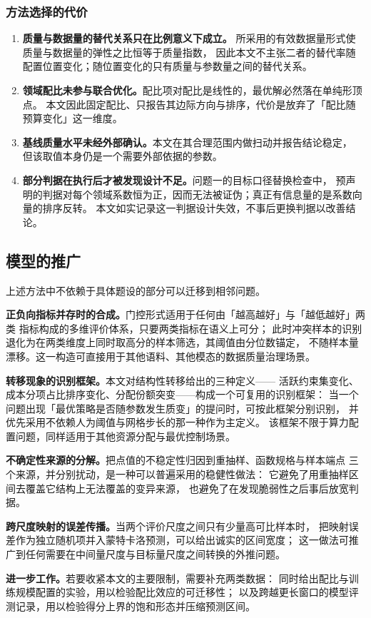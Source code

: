 \subsubsection{方法选择的代价}
\begin{enumerate}[label=(\arabic*),leftmargin=2.2em,itemsep=2pt]
  \item \textbf{质量与数据量的替代关系只在比例意义下成立。}
    所采用的有效数据量形式使质量与数据量的弹性之比恒等于质量指数，
    因此本文不主张二者的替代率随配置位置变化；随位置变化的只有质量与参数量之间的替代关系。
  \item \textbf{领域配比未参与联合优化。}配比项对配比是线性的，最优解必然落在单纯形顶点。
    本文因此固定配比、只报告其边际方向与排序，代价是放弃了「配比随预算变化」这一维度。
  \item \textbf{基线质量水平未经外部确认。}本文在其合理范围内做扫动并报告结论稳定，
    但该取值本身仍是一个需要外部依据的参数。
  \item \textbf{部分判据在执行后才被发现设计不足。}问题一的目标口径替换检查中，
    预声明的判据对每个领域系数恒为正，因而无法被证伪；真正有信息量的是系数向量的排序反转。
    本文如实记录这一判据设计失效，不事后更换判据以改善结论。
\end{enumerate}

\subsection{模型的推广}
上述方法中不依赖于具体题设的部分可以迁移到相邻问题。

\textbf{正负向指标并存时的合成。}门控形式适用于任何由「越高越好」与「越低越好」两类
指标构成的多维评价体系，只要两类指标在语义上可分；
此时冲突样本的识别退化为在两类维度上同时取高分的样本筛选，其阈值由分位数锚定，
不随样本量漂移。这一构造可直接用于其他语料、其他模态的数据质量治理场景。

\textbf{转移现象的识别框架。}本文对结构性转移给出的三种定义——
活跃约束集变化、成本分项占比排序变化、分配份额突变——构成一个可复用的识别框架：
当一个问题出现「最优策略是否随参数发生质变」的提问时，可按此框架分别识别，
并优先采用不依赖人为阈值与网格步长的那一种作为主定义。
该框架不限于算力配置问题，同样适用于其他资源分配与最优控制场景。

\textbf{不确定性来源的分解。}把点值的不稳定性归因到重抽样、函数规格与样本端点
三个来源，并分别扰动，是一种可以普遍采用的稳健性做法：
它避免了用重抽样区间去覆盖它结构上无法覆盖的变异来源，
也避免了在发现脆弱性之后事后放宽判据。

\textbf{跨尺度映射的误差传播。}当两个评价尺度之间只有少量高可比样本时，
把映射误差作为独立随机项并入蒙特卡洛预测，可以给出诚实的区间宽度；
这一做法可推广到任何需要在中间量尺度与目标量尺度之间转换的外推问题。

\textbf{进一步工作。}若要收紧本文的主要限制，需要补充两类数据：
同时给出配比与训练规模配置的实验，用以检验配比效应的可迁移性；
以及跨越更长窗口的模型评测记录，用以检验得分上界的饱和形态并压缩预测区间。
